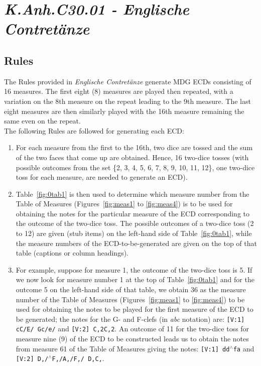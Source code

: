 \documentclass[letterpaper,x11names,svgnames,10pt]{article}
\begin{document}
\section{\em K.Anh.C30.01 - Englische Contret\"{a}nze}

\subsection{Rules}\label{genRules}

The Rules provided in {\em Englische Contret\"{a}nze} generate MDG ECDs consisting of 16 measures.  The first eight (8) measures are played then repeated, with a variation on the 8th measure on the repeat leading to the 9th measure.  The last eight measures are then similarly played with the 16th measure remaining the same even on the repeat. \\

The following Rules are followed for generating each ECD:
\begin{enumerate}
	\item [1.] For each measure from the first to the 16th, two dice are tossed and the sum of the two faces that come up are obtained.  Hence, 16 two-dice tosses (with possible outcomes from the set \{2, 3, 4, 5, 6, 7, 8, 9, 10, 11, 12\}, one two-dice toss for each measure, are needed to generate an ECD).   
	\item [2.] Table~\ref{fig:0tab1} is then used to determine which measure number from the Table of Measures (Figures~\ref{fig:meas1} to \ref{fig:meas4}) is to be used for obtaining the notes for the particular measure of the ECD corresponding to the outcome of the two-dice toss.  The possible outcomes of a two-dice toss (2 to 12) are given (stub items) on the left-hand side of Table~\ref{fig:0tab1}, while the measure numbers of the ECD-to-be-generated are given on the top of that table (captions or column  headings).
	\item [3.]  For example, suppose for measure 1, the outcome of the two-dice toss is 5.  If we now look for measure number 1 at the top of Table~\ref{fig:0tab1} and for the outcome 5 on the left-hand side of that table, we obtain 36 as the measure number of the Table of Measures (Figures~\ref{fig:meas1} to \ref{fig:meas4}) to be used for obtaining the notes to be played for the first measure of the ECD to be generated; the notes for the G- and F-clefs (in {\it abc} notation) are:  {\tt [V:1] cC/E/ Gc/e/} and {\tt [V:2] C,2C,2}. An outcome of 11 for the two-dice toss for measure nine (9) of the ECD to be constructed leads us to obtain the notes from measure 61 of the Table of Measures giving the notes: {\tt [V:1] dd$^\wedge$fa} and {\tt [V:2] D,/$^\wedge$F,/A,/F,/ D,C,}.
\end{enumerate}   
\end{document}
